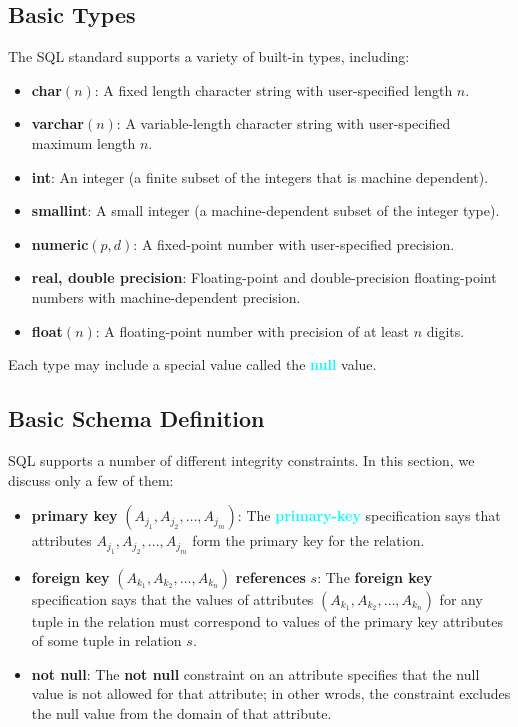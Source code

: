 \documentclass[a4paper,12pt,twoside,openany]{book}
\newcommand{\textcy}[1]{\textbf{\textcolor{cyan}{#1}}}
\begin{document}
\subsection{Basic Types}

The SQL standard supports a variety of built-in types, including:
\begin{itemize}
    \item\textbf{char}$(n)$: A fixed length character string with user-specified length $n$.
    \item\textbf{varchar}$(n)$: A variable-length character string with user-specified maximum length $n$.
    \item\textbf{int}: An integer (a finite subset of the integers that is machine dependent).
    \item\textbf{smallint}: A small integer (a machine-dependent subset of the integer type).
    \item\textbf{numeric}$(p,d)$: A fixed-point number with user-specified precision.
    \item\textbf{real, double precision}: Floating-point and double-precision floating-point numbers with machine-dependent precision.
    \item\textbf{float}$(n)$: A floating-point number with precision of at least $n$ digits.
\end{itemize}

Each type may include a special value called the \textcy{null} value.

\subsection{Basic Schema Definition}

SQL supports a number of different integrity constraints. In this section, we discuss only a few of them:
\begin{itemize}
    \item\textbf{primary key} $(A_{j_1},A_{j_2},\ldots,A_{j_m})$: The \textcy{primary-key} specification says that attributes $A_{j_1},A_{j_2},\ldots,A_{j_m}$ form the primary key for the relation.
    \item\textbf{foreign key} $(A_{k_1},A_{k_2},\ldots,A_{k_n})$ \textbf{references} $s$: The \textbf{foreign key} specification says that the values of attributes $(A_{k_1},A_{k_2},\ldots,A_{k_n})$ for any tuple in the relation must correspond to values of the primary key attributes of some tuple in relation $s$.
    \item\textbf{not null}: The \textbf{not null} constraint on an attribute specifies that the null value is not allowed for that attribute; in other wrods, the constraint excludes the null value from the domain of that attribute.
\end{itemize}
\end{document}
